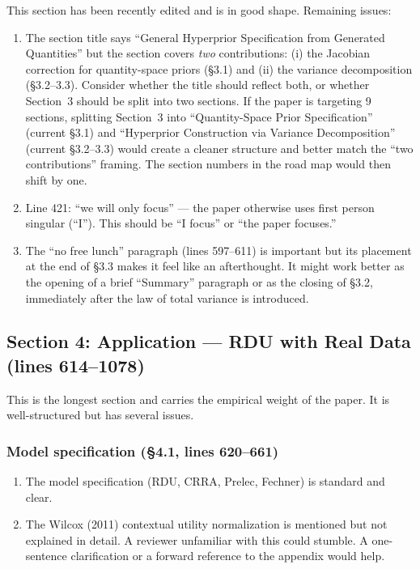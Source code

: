 \documentclass[12pt,a4paper]{article}
\begin{document}
This section has been recently edited and is in good shape. Remaining issues:

\begin{enumerate}[label=(\alph*)]
  \item The section title says ``General Hyperprior Specification from Generated
    Quantities'' but the section covers \emph{two} contributions: (i) the
    Jacobian correction for quantity-space priors (\S3.1) and (ii) the variance
    decomposition (\S3.2--3.3). Consider whether the title should reflect both,
    or whether Section~3 should be split into two sections. If the paper is
    targeting 9 sections, splitting Section~3 into ``Quantity-Space Prior
    Specification'' (current \S3.1) and ``Hyperprior Construction via Variance
    Decomposition'' (current \S3.2--3.3) would create a cleaner structure and
    better match the ``two contributions'' framing. The section numbers in the
    road map would then shift by one.
  \item Line 421: ``we will only focus'' --- the paper otherwise uses first
    person singular (``I''). This should be ``I focus'' or ``the paper focuses.''
  \item The ``no free lunch'' paragraph (lines 597--611) is important but its
    placement at the end of \S3.3 makes it feel like an afterthought. It might
    work better as the opening of a brief ``Summary'' paragraph or as the
    closing of \S3.2, immediately after the law of total variance is introduced.
\end{enumerate}


\subsection{Section 4: Application --- RDU with Real Data (lines 614--1078)}

This is the longest section and carries the empirical weight of the paper. It
is well-structured but has several issues.

\subsubsection{Model specification (\S4.1, lines 620--661)}

\begin{enumerate}[label=(\alph*)]
  \item The model specification (RDU, CRRA, Prelec, Fechner) is standard and
    clear.
  \item The Wilcox (2011) contextual utility normalization is mentioned but not
    explained in detail. A reviewer unfamiliar with this could stumble. A
    one-sentence clarification or a forward reference to the appendix would
    help.
\end{enumerate}
\end{document}
